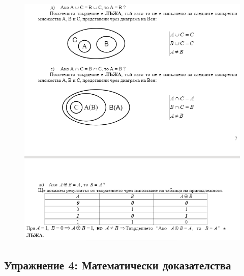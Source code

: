 \documentclass[fleqn, 12pt]{article}
\theoremstyle{definition}
\begin{document}
\begin{figure} 
\includegraphics{Pics/Discrete math/ex3/ex3-task10-2.png}
\end{figure}

\newpage
\subsection{Упражнение 4: Математически доказателства}
\end{document}
